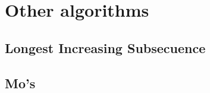 \newpage
\section{Other algorithms}
\subsection{Longest Increasing Subsecuence}


\subsection{Mo's}


